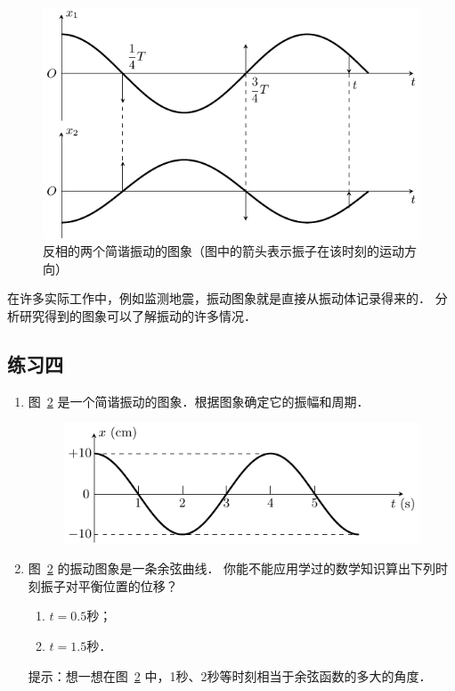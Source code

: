 \begin{figure}[htbp]
    \centering
    \includegraphics{fig/A/9-9.pdf}
    \caption{反相的两个简谐振动的图象（图中的箭头表示振子在该时刻的运动方向）}\label{fig_A_9-9}
\end{figure}

在许多实际工作中，例如监测地震，振动图象就是直接从振动体记录得来的．
分析研究得到的图象可以了解振动的许多情况．


\subsection*{练习四}


\begin{enumerate}
    \item 图~\ref{fig_A_9-10} 是一个简谐振动的图象．根据图象确定它的振幅和周期．
    \begin{figure}[htbp]
    	\centering
    	\includegraphics{fig/A/9-10.pdf}
    	\caption{}\label{fig_A_9-10}
    \end{figure}
    
    \item 图~\ref{fig_A_9-10} 的振动图象是一条余弦曲线．
    你能不能应用学过的数学知识算出下列时刻振子对平衡位置的位移？
    \begin{enumerate}
        \item $t=0.5$秒；
        \item $t=1.5$秒．
    \end{enumerate}

    提示：想一想在图~\ref{fig_A_9-10} 中，1秒、2秒等时刻相当于余弦函数的多大的角度．

\end{enumerate}


